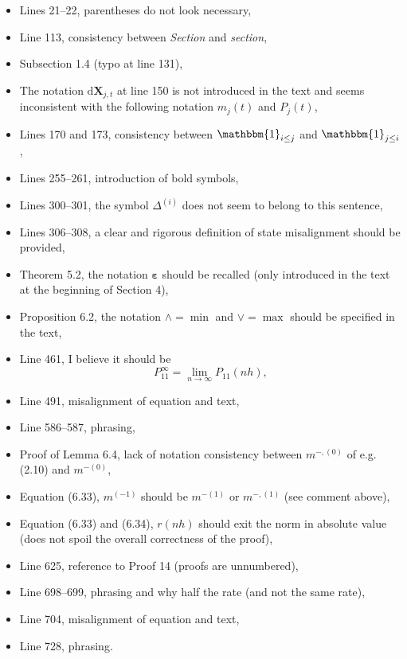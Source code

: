 \documentclass{article}
\begin{document}
\begin{itemize}[label=-]
	\item Lines 21--22, parentheses do not look necessary,
	\item Line 113, consistency between \textit{Section} and \textit{section},
	\item Subsection 1.4 (typo at line 131),
	\item The notation $\mathrm d \mathbf X_{j, t}$ at line 150 is not introduced in the text and seems inconsistent with the following notation $m_j(t)$ and $P_j(t)$,
	\item Lines 170 and 173, consistency between $\mathbbm{1}_{i\leq j}$ and $\mathbbm{1}_{j \leq i}$,
	\item Lines 255--261, introduction of bold symbols,
	\item Lines 300--301, the symbol $\Delta^{(i)}$ does not seem to belong to this sentence,
	\item Lines 306--308, a clear and rigorous definition of state misalignment should be provided,
	\item Theorem 5.2, the notation $\boldsymbol{\varepsilon}$ should be recalled (only introduced in the text at the beginning of Section 4),
	\item Proposition 6.2, the notation $\wedge = \min$ and $\vee = \max$ should be specified in the text,
	\item Line 461, I believe it should be
	\[
		P_{11}^\infty = \lim_{n\to \infty} P_{11}(nh),
	\]
	\item Line 491, misalignment of equation and text,
	\item Line 586--587, phrasing, 
	\item Proof of Lemma 6.4, lack of notation consistency between $m^{-,(0)}$ of e.g. (2.10) and $m^{-(0)}$, 
	\item Equation (6.33), $m^{(-1)}$ should be $m^{-(1)}$ or $m^{-, (1)}$ (see comment above),
	\item Equation (6.33) and (6.34), $r(nh)$ should exit the norm in absolute value (does not spoil the overall correctness of the proof),
	\item Line 625, reference to Proof 14 (proofs are unnumbered),
	\item Line 698--699, phrasing and why half the rate (and not the same rate),
	\item Line 704, misalignment of equation and text,
	\item Line 728, phrasing.
\end{itemize}
\end{document}
